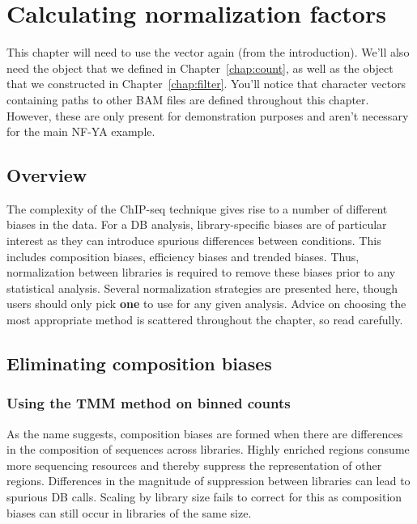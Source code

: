 \documentclass{report}\usepackage[]{graphicx}\usepackage[usenames,dvipsnames]{color}
\newenvironment{combox}
{ \definecolor{shadecolor}{RGB}{255, 240, 240} \begin{shaded}\begin{center}\begin{minipage}[t]{0.95\textwidth} }
{ \end{minipage}\end{center}\end{shaded} \definecolor{shadecolor}{RGB}{240,240,240} }
\begin{document}

\chapter{Calculating normalization factors}
\label{chap:norm}
\begin{combox}
This chapter will need to use the  vector again (from the introduction). 
We'll also need the  object that we defined in Chapter~\ref{chap:count}, as well as the  object that we constructed in Chapter~\ref{chap:filter}.
You'll notice that character vectors containing paths to other BAM files are defined throughout this chapter. 
However, these are only present for demonstration purposes and aren't necessary for the main NF-YA example.
\end{combox}

\section{Overview}
The complexity of the ChIP-seq technique gives rise to a number of different biases in the data.
For a DB analysis, library-specific biases are of particular interest as they can introduce spurious differences between conditions.
This includes composition biases, efficiency biases and trended biases.
Thus, normalization between libraries is required to remove these biases prior to any statistical analysis.
Several normalization strategies are presented here, though users should only pick \textbf{one} to use for any given analysis.
Advice on choosing the most appropriate method is scattered throughout the chapter, so read carefully.

\section{Eliminating composition biases}
\label{sec:compo_norm}

\subsection{Using the TMM method on binned counts}
As the name suggests, composition biases are formed when there are differences in the composition of sequences across libraries. 
Highly enriched regions consume more sequencing resources and thereby suppress the representation of other regions. 
Differences in the magnitude of suppression between libraries can lead to spurious DB calls. 
Scaling by library size fails to correct for this as composition biases can still occur in libraries of the same size. 
\end{document}
